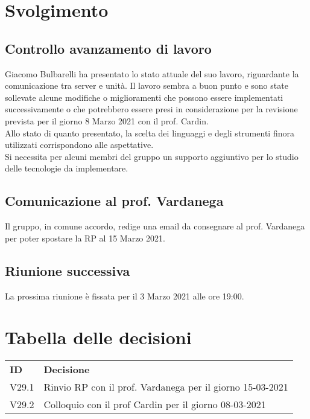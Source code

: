 \documentclass[]{article}
\begin{document}
	\newpage

	\section{Svolgimento}
		\subsection{Controllo avanzamento di lavoro}
		Giacomo Bulbarelli ha presentato lo stato attuale del suo lavoro, riguardante la comunicazione tra server e unità. Il lavoro sembra a buon punto e sono state sollevate alcune modifiche o miglioramenti che possono essere implementati successivamente o che potrebbero essere presi in considerazione per la revisione prevista per il giorno 8 Marzo 2021 con il prof. Cardin. \\
		Allo stato di quanto presentato, la scelta dei linguaggi e degli strumenti finora utilizzati corrispondono alle aspettative. \\
		Si necessita per alcuni membri del gruppo un supporto aggiuntivo per lo studio delle tecnologie da implementare.\\
		
		\subsection{Comunicazione al prof. Vardanega}
		Il gruppo, in comune accordo, redige una email da consegnare al prof. Vardanega per poter spostare la RP al 15 Marzo 2021.\\
		
	\subsection{Riunione successiva}
	La prossima riunione è fissata per il 3 Marzo 2021 alle ore 19:00.
		
	\newpage
	
	\section{Tabella delle decisioni}
	
	\begin{table} [h!]
		\begin{center}
			\begin{tabular} { m{2cm} m{14cm} }
				\rowcolor{lightgray}
				\textbf{ID} & \textbf{Decisione}\\
				V29.1 & Rinvio RP con il prof. Vardanega per il giorno 15-03-2021\\
				V29.2 & Colloquio con il prof Cardin per il giorno 08-03-2021
			\end{tabular}
		\end{center}
	\end{table}
	
\end{document}
